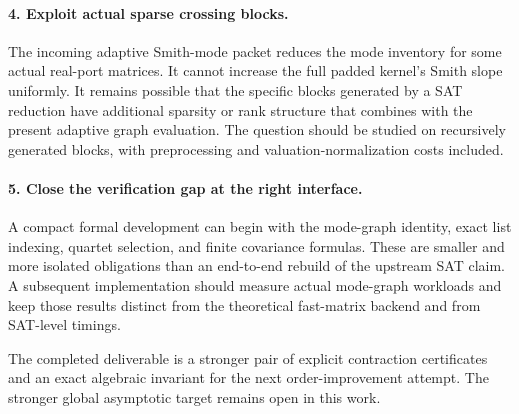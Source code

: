 \paragraph{4. Exploit actual sparse crossing blocks.}
The incoming adaptive Smith-mode packet reduces the mode inventory for
some actual real-port matrices. It cannot increase the full padded
kernel's Smith slope uniformly. It remains possible that the specific
blocks generated by a SAT reduction have additional sparsity or rank
structure that combines with the present adaptive graph evaluation.
The question should be studied on recursively generated blocks, with
preprocessing and valuation-normalization costs included.

\paragraph{5. Close the verification gap at the right interface.}
A compact formal development can begin with the mode-graph identity,
exact list indexing, quartet selection, and finite covariance formulas.
These are smaller and more isolated obligations than an end-to-end
rebuild of the upstream SAT claim. A subsequent implementation should
measure actual mode-graph workloads and keep those results distinct
from the theoretical fast-matrix backend and from SAT-level timings.

The completed deliverable is a stronger pair of explicit contraction
certificates and an exact algebraic invariant for the next order-improvement
attempt. The stronger global asymptotic target remains open in this work.

